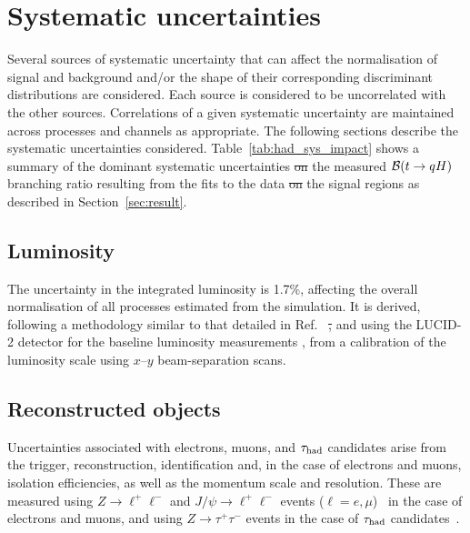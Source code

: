 \documentclass[PAPER, coverpage, atlasdraft=true, texlive=2016, UKenglish]{\ATLASLATEXPATH atlasdoc}
\providecommand{\DIFadd}[1]{{\protect\color{blue}\uwave{#1}}} %
\providecommand{\DIFdel}[1]{{\protect\color{red}\sout{#1}}}                      %
\providecommand{\DIFaddbegin}{} %
\providecommand{\DIFaddend}{} %
\providecommand{\DIFdelbegin}{} %
\providecommand{\DIFdelend}{} %
\begin{document}
\section{Systematic uncertainties}
\label{sec:systematics}

Several sources of systematic uncertainty that can affect the normalisation of signal 
and background and/or the shape of their corresponding discriminant distributions are considered.
Each source is considered to be uncorrelated with the other sources.  
Correlations of a given systematic uncertainty are maintained across processes and channels 
as appropriate. The following sections describe the systematic uncertainties considered.
Table~\ref{tab:had_sys_impact} shows a summary of the dominant systematic uncertainties \DIFdelbegin \DIFdel{on }\DIFdelend \DIFaddbegin \DIFadd{in }\DIFaddend the measured $\mathcal{B}(t\to qH)$ branching ratio
resulting from the fits to the data \DIFdelbegin \DIFdel{on }\DIFdelend \DIFaddbegin \DIFadd{in }\DIFaddend the signal regions as described in Section~\ref{sec:result}.

\subsection{Luminosity}
\label{sec:syst_lumi}

The uncertainty in the integrated luminosity is 1.7\%, affecting the overall normalisation of all processes estimated from the simulation. 
It is derived, following a methodology similar to that detailed in Ref.~\cite{Aaboud:2016hhf} \DIFdelbegin \DIFdel{, }\DIFdelend and using the LUCID-2 detector 
for the baseline luminosity measurements \cite{Avoni:2018iuv}, from a calibration of the luminosity scale using $x$--$y$ beam-separation scans.

\subsection{Reconstructed objects}
\label{sec:syst_objects}

Uncertainties associated with electrons, muons, and $\tau_{\mathrm{had}}$ candidates arise from the trigger, reconstruction,  
identification and, in the case of electrons and muons, isolation efficiencies, as well as the momentum scale and resolution. 
These are measured using $Z\to \ell^+\ell^-$ and $J/\psi\to \ell^+\ell^-$ events ($\ell =e, \mu$)~\cite{ATLAS-CONF-2016-024,Aad:2016jkr} 
in the case of electrons and muons, and using $Z\to \tau^+\tau^-$ events in the case of $\tau_{\mathrm{had}}$ candidates~\cite{ATLAS-CONF-2017-029}.
\end{document}
